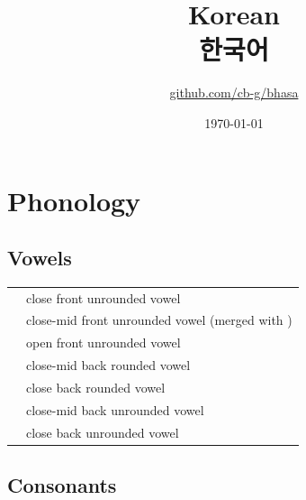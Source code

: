 \documentclass{article}
\title{Korean\\{\hangulfont 한국어}\\\ipa{[han.gu.g2]}}
\author{\href{https://github.com/cb-g/bhasa}{github.com/cb-g/bhasa}}
\date{\today}
\begin{document}
\pagecolor{custom_bg}\color{custom_fg}
\maketitle\thispagestyle{empty}

\newpage\setcounter{page}{1}\section{Phonology}

\subsection{Vowels}

\begin{xltabular}{\textwidth}{lL}
   & close front unrounded vowel \\
   & close-mid front unrounded vowel (merged with ) \\
   & open front unrounded vowel \\
   & close-mid back rounded vowel \\
   & close back rounded vowel \\
   & close-mid back unrounded vowel \\
   & close back unrounded vowel \\
\end{xltabular}

\subsection{Consonants}
\end{document}
